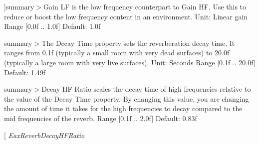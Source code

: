 \begin{Desc}
\begin{description}
{}]summary$>$Gain L\-F is the low frequency counterpart to Gain H\-F. Use this to reduce or boost the low frequency content in an environment. Unit\-: Linear gain Range \mbox{[}0.\-0f .. 1.\-0f\mbox{]} Default\-: 1.\-0f\item[{\em 
\hypertarget{namespace_open_t_k_1_1_audio_1_1_open_a_l_aa0356299908369b4365d28572c0ec20ba1db143cb7ef5e96237924311edaa3ad6}{Eax\-Reverb\-Gain\-L\-F}\label{namespace_open_t_k_1_1_audio_1_1_open_a_l_aa0356299908369b4365d28572c0ec20ba1db143cb7ef5e96237924311edaa3ad6}
}]summary$>$The Decay Time property sets the reverberation decay time. It ranges from 0.\-1f (typically a small room with very dead surfaces) to 20.\-0f (typically a large room with very live surfaces). Unit\-: Seconds Range \mbox{[}0.\-1f .. 20.\-0f\mbox{]} Default\-: 1.\-49f\item[{\em 
\hypertarget{namespace_open_t_k_1_1_audio_1_1_open_a_l_aa0356299908369b4365d28572c0ec20ba393b1b91035cf13c536fa9cd9a2a7b7f}{Eax\-Reverb\-Decay\-Time}\label{namespace_open_t_k_1_1_audio_1_1_open_a_l_aa0356299908369b4365d28572c0ec20ba393b1b91035cf13c536fa9cd9a2a7b7f}
}]summary$>$Decay H\-F Ratio scales the decay time of high frequencies relative to the value of the Decay Time property. By changing this value, you are changing the amount of time it takes for the high frequencies to decay compared to the mid frequencies of the reverb. Range \mbox{[}0.\-1f .. 2.\-0f\mbox{]} Default\-: 0.\-83f\item[{\em 
\hypertarget{namespace_open_t_k_1_1_audio_1_1_open_a_l_aa0356299908369b4365d28572c0ec20bad56bf1015c7b95e167b4e5e3efe8ccbd}{Eax\-Reverb\-Decay\-H\-F\-Ratio}\label{namespace_open_t_k_1_1_audio_1_1_open_a_l_aa0356299908369b4365d28572c0ec20bad56bf1015c7b95e167b4e5e3efe8ccbd}
}
\end{description}
\end{Desc}
